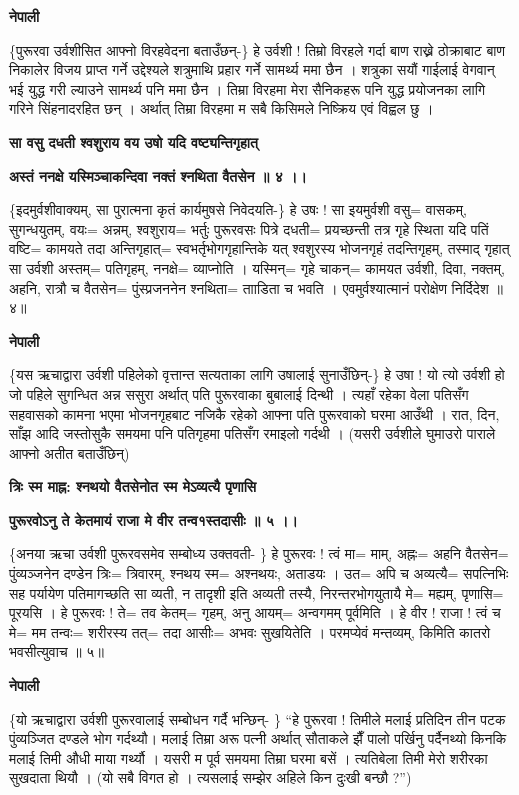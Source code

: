 \documentclass[11pt, a5paper]{article}
\begin{document}
\textbf{नेपाली}

\{पुरूरवा उर्वशीसित आफ्नो विरहवेदना बताउँछन्-\} हे उर्वशी ! तिम्रो विरहले गर्दा बाण राख्ने ठोक्राबाट बाण निकालेर विजय प्राप्त गर्ने उद्देश्यले शत्रुमाथि प्रहार गर्ने सामर्थ्य ममा छैन । शत्रुका सयौं गाईलाई वेगवान् भई युद्ध गरी ल्याउने सामर्थ्य पनि ममा छैन । तिम्रा विरहमा मेरा सैनिकहरू पनि युद्ध प्रयोजनका लागि गरिने सिंहनादरहित छन् । अर्थात् तिम्रा विरहमा म सबै किसिमले निष्क्रिय एवं विह्वल छु ।

\textbf{सा वसु दधती श्वशुराय वय उषो यदि वष्ट्यन्तिगृहात्}

\textbf{अस्तं ननक्षे यस्मिञ्चाकन्दिवा नक्तं श्नथिता वैतसेन ॥ ४ ।।}

\{इदमुर्वशीवाक्यम्, सा पुरात्मना कृतं कार्यमुषसे निवेदयति-\} हे उषः !  सा इयमुर्वशी वसु= वासकम्, सुगन्धयुतम्, वयः= अन्नम्, श्वशुराय= भर्तुः पुरूरवसः पित्रे दधती= प्रयच्छन्ती  तत्र गृहे स्थिता यदि पतिं  वष्टि= कामयते तदा अन्तिगृहात्= स्वभर्तृभोगगृहान्तिके यत् श्वशुरस्य भोजनगृहं तदन्तिगृहम्, तस्माद् गृहात् सा उर्वशी अस्तम्= पतिगृहम्, ननक्षे= व्याप्नोति । यस्मिन्= गृहे चाकन्= कामयत उर्वशी, दिवा, नक्तम्, अहनि, रात्रौ च वैतसेन= पुंस्प्रजननेन श्नथिता= तााडिता च भवति । एवमुर्वश्यात्मानं परोक्षेण निर्दिदेश ॥ ४॥

\textbf{नेपाली}

\{यस ऋचाद्वारा उर्वशी पहिलेको वृत्तान्त सत्यताका लागि उषालाई सुनाउँछिन्-\} हे उषा ! यो त्यो उर्वशी हो जो पहिले सुगन्धित अन्न ससुरा अर्थात् पति पुरूरवाका बुबालाई दिन्थी । त्यहाँ रहेका वेला पतिसँग सहवासको कामना भएमा भोजनगृहबाट नजिकै रहेको आफ्ना पति पुरूरवाको घरमा आउँथी । रात, दिन, साँझ आदि जस्तोसुकै समयमा पनि  पतिगृहमा पतिसँग रमाइलो गर्दथी । (यसरी उर्वशीले घुमाउरो पाराले आफ्नो अतीत बताउँछिन्)

\textbf{त्रिः स्म माह्न: श्नथयो वैतसेनोत स्म मेऽव्यत्यै पृणासि}

\textbf{पुरूरवोऽनु ते केतमायं राजा मे वीर तन्व१स्तदासीः ॥ ५ ।।}

\{अनया ऋचा उर्वशी पुरूरवसमेव सम्बोध्य उक्तवती- \} हे पुरूरवः !  त्वं मा= माम्, अह्नः= अहनि वैतसेन= पुंव्यञ्जनेन दण्डेन त्रिः= त्रिवारम्, श्नथय स्म= अश्नथयः, अताडयः । उत= अपि च अव्यत्यै= सपत्निभिः सह पर्यायेण पतिमागच्छति सा व्यती, न तादृशी इति अव्यती तस्यै, निरन्तरभोगयुतायै मे= मह्यम्, पृणासि= पूरयसि । हे पुरूरवः ! ते= तव केतम्= गृहम्, अनु आयम्= अन्वगमम्  पूर्वमिति । हे वीर ! राजा ! त्वं च मे= मम तन्वः= शरीरस्य तत्= तदा आसीः= अभवः सुखयितेति । परमप्येवं मन्तव्यम्, किमिति कातरो भवसीत्युवाच  ॥ ५॥

\textbf{नेपाली}

\{यो ऋचाद्वारा उर्वशी पुरूरवालाई सम्बोधन गर्दै भन्छिन्- \} “हे पुरूरवा ! तिमीले मलाई प्रतिदिन तीन पटक पुंव्यञ्जित दण्डले भोग गर्दथ्यौ। मलाई तिम्रा अरू पत्नी अर्थात् सौताकले झैँ पालो पर्खिनु पर्दैनथ्यो किनकि मलाई तिमी औधी माया गर्थ्यौ । यसरी म पूर्व समयमा तिम्रा घरमा बसें । त्यतिबेला तिमी मेरो शरीरका सुखदाता थियौ । (यो सबै विगत हो । त्यसलाई सम्झेर अहिले किन दुःखी बन्छौ ?”)
\end{document}
